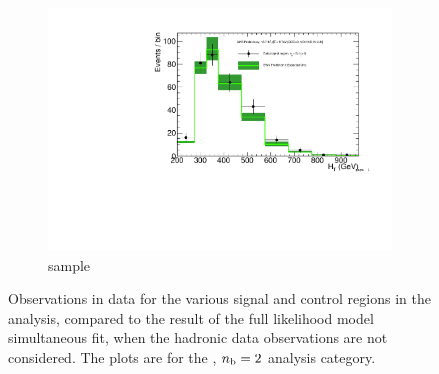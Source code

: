 \begin{figure}[h!]
\begin{subfigure}[b]{0.48\textwidth}
    \includegraphics[width=\textwidth,page=4]
    {Figs/results/v0/greenBand/bestFit_2012dev_RQcdZero_fZinvAll_2b_ge4j-1_smOnly}
    \caption{\mj sample}
  \end{subfigure}
  \caption{Observations in data for the various signal and control
  regions in the analysis, compared to the result of the full likelihood model
  simultaneous fit, when the hadronic data observations are not considered. The
  plots are for the \njhigh, $n_{\text{b}} = 2$ analysis category.}
  \label{fig:green_fits_2b_ge4j}
\end{figure}


